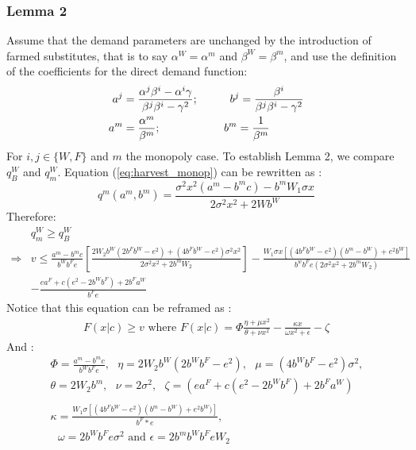 \subsubsection{Lemma 2}
\label{section:AppendixC}
Assume that the demand parameters are unchanged by the introduction of farmed substitutes, that is to say $\alpha^W  = \alpha ^m$ and $\beta^W= \beta^m$, and use the definition of the coefficients for the direct demand function:
\begin{align*}
 a^{j} &= \frac{\alpha^{j} \beta^{i} - \alpha^{i}\gamma}{\beta^{j} \beta^{i} - \gamma^2}; \hspace*{1cm}
  b^{j} = \frac{\beta^{i}}{\beta^{j} \beta^{i} - \gamma^2}\\
 a^m &= \frac{\alpha^m}{\beta^m}; \hspace*{2cm}
b^m = \frac{1}{\beta^m}
\end{align*}
For $i,j \in \{W, F\}$ and $m$ the monopoly case.
To establish Lemma 2, we compare $q^W_B$ and $q^W_m$. Equation (\ref{eq:harvest_monop}) can be rewritten as : 
$$
q^m(a^m, b^m) = \frac{\sigma^2 x^2(a^m - b^m c) - b^m W_1 \sigma x}{2\sigma^2 x^2 +2Wb^W}
$$
%
Therefore:
\begin{align*}
    &q^W_m \geq q_B^W\\
    \Rightarrow & v \leq \frac{a^m - b^m c}{b^Wb^Fe}\left[ \frac{2 W_2 b^W(2b^Fb^W - e^2) + (4b^Fb^W - e^2)\sigma^2 x^2}{2 \sigma^2 x^2 + 2 b^m W_2}\right]  - \frac{W_1 \sigma x[(4 b^F b^W - e^2)(b^m - b^W) + e^2 b^W]}{b^wb^Fe(2\sigma^2 x^2 + 2b^m W_2)} \\
    & - \frac{ea^F + c(e^2 - 2b^Wb^F) + 2b^F a^W}{b^F e}
\end{align*}
Notice that this equation can be reframed as : 
\begin{align*}
    F(x|c) \geq v \text{ where } F(x|c) = \Phi \frac{\eta + \mu x^2}{\theta + \nu x^2} -\frac{ \kappa x}{\omega x^2 + \epsilon} - \zeta
\end{align*}
And :
\begin{align*}
    &\Phi = \frac{a^m - b^mc}{b^W b^F e},\text{ }
    \eta = 2W_2b^W(2b^Wb^F - e^2),\text{ } 
    \mu = (4b^Wb^F - e^2)\sigma^2,\text{ }\\
    &\theta= 2W_2b^m,\text{ }
    \nu = 2\sigma^2,\text{ }
    \zeta  = (ea^F + c(e^2 - 2b^W b^F) + 2b^F a^W)\\
    \\
    &\kappa = \frac{W_1 \sigma [(4b^F b^W - e^2)(b^m - b^W) + e^2 b^W)]}{b^F*e}, \\
    &\text{ }\omega = 2b^Wb^Fe \sigma^2
    \text{ and } \epsilon = 2b^m b^W b^F e W_2
\end{align*}

